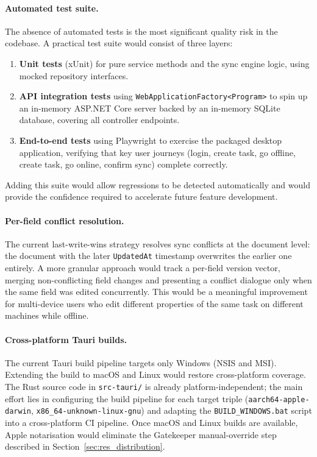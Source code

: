 \paragraph{Automated test suite.}
The absence of automated tests is the most significant quality risk in the codebase.
A practical test suite would consist of three layers:
\begin{enumerate}
  \item \textbf{Unit tests} (xUnit) for pure service methods and the sync engine logic,
        using mocked repository interfaces.
  \item \textbf{API integration tests} using \texttt{WebApplicationFactory<Program>} to
        spin up an in-memory ASP.NET Core server backed by an in-memory SQLite database,
        covering all controller endpoints.
  \item \textbf{End-to-end tests} using Playwright to exercise the packaged
        desktop application, verifying that key user journeys (login, create task, go offline,
        create task, go online, confirm sync) complete correctly.
\end{enumerate}
Adding this suite would allow regressions to be detected automatically and would
provide the confidence required to accelerate future feature development.

\paragraph{Per-field conflict resolution.}
The current last-write-wins strategy resolves sync conflicts at the document level:
the document with the later \texttt{UpdatedAt} timestamp overwrites the earlier one
entirely.
A more granular approach would track a per-field version vector, merging non-conflicting
field changes and presenting a conflict dialogue only when the same field was edited
concurrently.
This would be a meaningful improvement for multi-device users who edit different
properties of the same task on different machines while offline.

\paragraph{Cross-platform Tauri builds.}
The current Tauri build pipeline targets only Windows (NSIS and MSI).
Extending the build to macOS and Linux would restore cross-platform
coverage. The Rust source code in
\texttt{src-tauri/} is already platform-independent; the main effort lies
in configuring the build pipeline for each target triple
(\texttt{aarch64-apple-darwin}, \texttt{x86\_64-unknown-linux-gnu}) and
adapting the \texttt{BUILD\_WINDOWS.bat} script into a cross-platform CI
pipeline. Once macOS and Linux builds are available, Apple notarisation would
eliminate the Gatekeeper manual-override step described in
Section~\ref{sec:res_distribution}.

